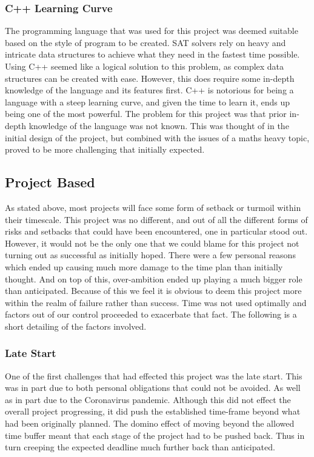 \documentclass{article}
\begin{document}
\subsubsection{C++ Learning Curve}
The programming language that was used for this project was deemed suitable based on the style of program to be created. SAT
solvers rely on heavy and intricate data structures to achieve what they need in the fastest time possible. Using C++ seemed like
a logical solution to this problem, as complex data structures can be created with ease. However, this does require some in-depth
knowledge of the language and its features first. C++ is notorious for being a language with a steep learning curve, and given the
time to learn it, ends up being one of the most powerful. The problem for this project was that prior in-depth knowledge of the
language was not known. This was thought of in the initial design of the project, but combined with the issues of a maths heavy
topic, proved to be more challenging that initially expected.

\subsection{Project Based}
As stated above, most projects will face some form of setback or turmoil within their timescale. This project was no different,
and out of all the different forms of risks and setbacks that could have been encountered, one in particular stood out. However,
it would not be the only one that we could blame for this project not turning out as successful as initially hoped. There were a
few personal reasons which ended up causing much more damage to the time plan than initially thought. And on top of this,
over-ambition ended up playing a much bigger role than anticipated. Because of this we feel it is obvious to deem this project
more within the realm of failure rather than success. Time was not used optimally and factors out of our control proceeded to
exacerbate that fact. The following is a short detailing of the factors involved.

\subsubsection{Late Start}
One of the first challenges that had effected this project was the late start. This was in part due to both personal obligations
that could not be avoided. As well as in part due to the Coronavirus pandemic. Although this did not effect the overall project
progressing, it did push the established time-frame beyond what had been originally planned. The domino effect of moving beyond
the allowed time buffer meant that each stage of the project had to be pushed back. Thus in turn creeping the expected deadline
much further back than anticipated.
\end{document}
